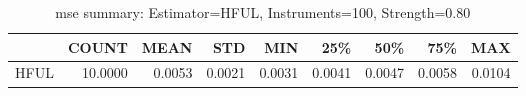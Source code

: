 \begin{table}[ht]
\centering
\caption{mse summary: Estimator=HFUL, Instruments=100, Strength=0.80}
\begin{tabular}{lrrrrrrrr}
\toprule
 & COUNT & MEAN & STD & MIN & 25\% & 50\% & 75\% & MAX \\
\midrule
HFUL & 10.0000 & 0.0053 & 0.0021 & 0.0031 & 0.0041 & 0.0047 & 0.0058 & 0.0104 \\
\bottomrule
\end{tabular}
\end{table}
